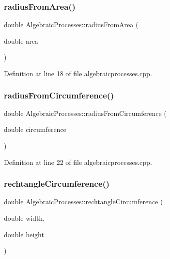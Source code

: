 \subsubsection{\texorpdfstring{radius\+From\+Area()}{radiusFromArea()}}
{\footnotesize\ttfamily double Algebraic\+Processes\+::radius\+From\+Area (\begin{DoxyParamCaption}\item[{double}]{area }\end{DoxyParamCaption})}



Definition at line 18 of file algebraicprocesses.\+cpp.

\mbox{\label{class_algebraic_processes_a30a85ad3389c5a2c55e26d8ed1d8ef05}} 
\subsubsection{\texorpdfstring{radius\+From\+Circumference()}{radiusFromCircumference()}}
{\footnotesize\ttfamily double Algebraic\+Processes\+::radius\+From\+Circumference (\begin{DoxyParamCaption}\item[{double}]{circumference }\end{DoxyParamCaption})}



Definition at line 22 of file algebraicprocesses.\+cpp.

\mbox{\label{class_algebraic_processes_ae2e5b4fc2cc551b0905408c04112310d}} 
\subsubsection{\texorpdfstring{rechtangle\+Circumference()}{rechtangleCircumference()}}
{\footnotesize\ttfamily double Algebraic\+Processes\+::rechtangle\+Circumference (\begin{DoxyParamCaption}\item[{double}]{width,  }\item[{double}]{height }\end{DoxyParamCaption})}



